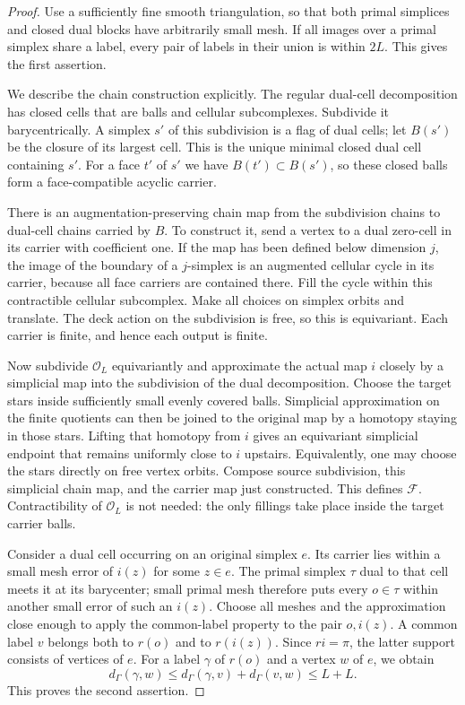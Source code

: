 \begin{proof}
Use a sufficiently fine smooth triangulation, so that both primal
simplices and closed dual blocks have arbitrarily small mesh.  If all
images over a primal simplex share a label, every pair of labels in
their union is within $2L$.  This gives the first assertion.

We describe the chain construction explicitly.  The regular dual-cell
decomposition has closed cells that are balls and cellular subcomplexes.
Subdivide it barycentrically.  A simplex $s'$ of this subdivision is a
flag of dual cells; let $B(s')$ be the closure of its largest cell.
This is the unique minimal closed dual cell containing $s'$.  For a
face $t'$ of $s'$ we have $B(t')\subset B(s')$, so these closed balls
form a face-compatible acyclic carrier.

There is an augmentation-preserving chain map from the subdivision
chains to dual-cell chains carried by $B$.  To construct it, send a
vertex to a dual zero-cell in its carrier with coefficient one.  If
the map has been defined below dimension $j$, the image of the boundary
of a $j$-simplex is an augmented cellular cycle in its carrier, because
all face carriers are contained there.  Fill the cycle within this
contractible cellular subcomplex.  Make all choices on simplex orbits
and translate.  The deck action on the subdivision is free, so this is
equivariant.  Each carrier is finite, and hence each output is finite.

Now subdivide $\mathcal O_L$ equivariantly and approximate the actual
map $i$ closely by a simplicial map into the subdivision of the dual
decomposition. Choose the target stars inside sufficiently small evenly
covered balls. Simplicial approximation on the finite quotients can then
be joined to the original map by a homotopy staying in those stars.
Lifting that homotopy from $i$ gives an equivariant simplicial endpoint
that remains uniformly close to $i$ upstairs. Equivalently, one may choose
the stars directly on free vertex orbits. Compose source subdivision,
this simplicial chain map, and the carrier map just constructed.  This
defines $\mathcal F$.  Contractibility of $\mathcal O_L$ is not needed:
the only fillings take place inside the target carrier balls.

Consider a dual cell occurring on an original simplex $e$.  Its
carrier lies within a small mesh error of $i(z)$ for some $z\in e$.
The primal simplex $\tau$ dual to that cell meets it at its barycenter;
small primal mesh therefore puts every $o\in\tau$ within another small
error of such an $i(z)$.  Choose all meshes and the approximation close
enough to apply the common-label property to the pair $o,i(z)$.  A
common label $v$ belongs both to $r(o)$ and to $r(i(z))$.  Since
$ri=\pi$, the latter support consists of vertices of $e$.  For a label
$\gamma$ of $r(o)$ and a vertex $w$ of $e$, we obtain
\[
 d_\Gamma(\gamma,w)
 \le d_\Gamma(\gamma,v)+d_\Gamma(v,w)\le L+L.
\]
This proves the second assertion.
\end{proof}

